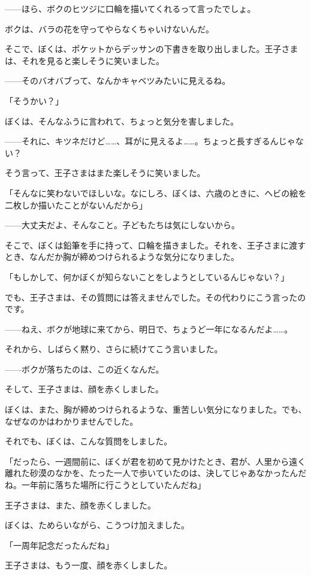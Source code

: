 ——ほら、ボクのヒツジに口輪を描いてくれるって言ったでしょ。

ボクは、バラの花を守ってやらなくちゃいけないんだ。

そこで、ぼくは、ポケットからデッサンの下書きを取り出しました。王子さまは、それを見ると楽しそうに笑いました。

——そのバオバブって、なんかキャベツみたいに見えるね。

「そうかい？」

ぼくは、そんなふうに言われて、ちょっと気分を害しました。

——それに、キツネだけど……、耳がに見えるよ……。ちょっと長すぎるんじゃない？

そう言って、王子さまはまた楽しそうに笑いました。

「そんなに笑わないでほしいな。なにしろ、ぼくは、六歳のときに、ヘビの絵を二枚しか描いたことがないんだから」

——大丈夫だよ、そんなこと。子どもたちは気にしないから。

そこで、ぼくは鉛筆を手に持って、口輪を描きました。それを、王子さまに渡すとき、なんだか胸が締めつけられるような気分になりました。

「もしかして、何かぼくが知らないことをしようとしているんじゃない？」

でも、王子さまは、その質問には答えませんでした。その代わりにこう言ったのです。

——ねえ、ボクが地球に来てから、明日で、ちょうど一年になるんだよ……。

それから、しばらく黙り、さらに続けてこう言いました。

——ボクが落ちたのは、この近くなんだ。

そして、王子さまは、顔を赤くしました。

ぼくは、また、胸が締めつけられるような、重苦しい気分になりました。でも、なぜなのかはわかりませんでした。

それでも、ぼくは、こんな質問をしました。

「だったら、一週間前に、ぼくが君を初めて見かけたとき、君が、人里から遠く離れた砂漠のなかを、たった一人で歩いていたのは、決してじゃあなかったんだね。一年前に落ちた場所に行こうとしていたんだね」

王子さまは、また、顔を赤くしました。

ぼくは、ためらいながら、こうつけ加えました。

「一周年記念だったんだね」

王子さまは、もう一度、顔を赤くしました。

